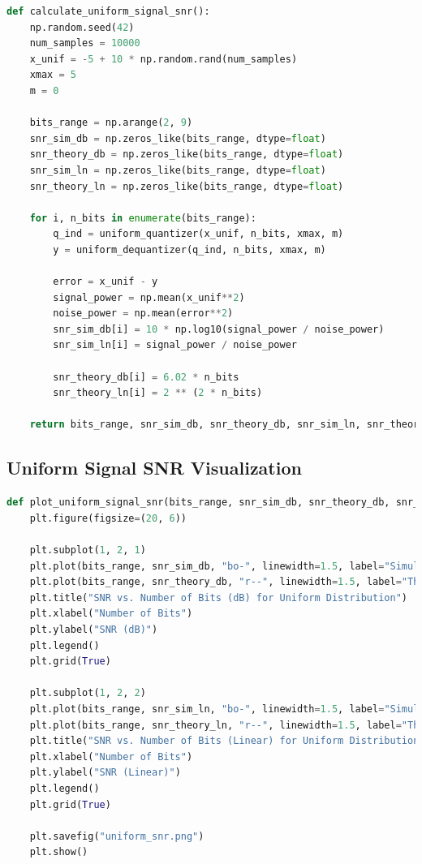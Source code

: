 \documentclass{article}
\begin{document}
\begin{lstlisting}[language=Python, caption=SNR Calculation for Uniform Signal]
def calculate_uniform_signal_snr():
    np.random.seed(42)
    num_samples = 10000
    x_unif = -5 + 10 * np.random.rand(num_samples)
    xmax = 5
    m = 0
    
    bits_range = np.arange(2, 9)
    snr_sim_db = np.zeros_like(bits_range, dtype=float)
    snr_theory_db = np.zeros_like(bits_range, dtype=float)
    snr_sim_ln = np.zeros_like(bits_range, dtype=float)
    snr_theory_ln = np.zeros_like(bits_range, dtype=float)

    for i, n_bits in enumerate(bits_range):
        q_ind = uniform_quantizer(x_unif, n_bits, xmax, m)
        y = uniform_dequantizer(q_ind, n_bits, xmax, m)

        error = x_unif - y
        signal_power = np.mean(x_unif**2)
        noise_power = np.mean(error**2)
        snr_sim_db[i] = 10 * np.log10(signal_power / noise_power)
        snr_sim_ln[i] = signal_power / noise_power

        snr_theory_db[i] = 6.02 * n_bits
        snr_theory_ln[i] = 2 ** (2 * n_bits)
        
    return bits_range, snr_sim_db, snr_theory_db, snr_sim_ln, snr_theory_ln
\end{lstlisting}

\subsection{Uniform Signal SNR Visualization}

\begin{lstlisting}[language=Python, caption=Uniform Signal SNR Visualization]
def plot_uniform_signal_snr(bits_range, snr_sim_db, snr_theory_db, snr_sim_ln, snr_theory_ln):
    plt.figure(figsize=(20, 6))

    plt.subplot(1, 2, 1)
    plt.plot(bits_range, snr_sim_db, "bo-", linewidth=1.5, label="Simulated SNR (dB)")
    plt.plot(bits_range, snr_theory_db, "r--", linewidth=1.5, label="Theoretical SNR (dB)")
    plt.title("SNR vs. Number of Bits (dB) for Uniform Distribution")
    plt.xlabel("Number of Bits")
    plt.ylabel("SNR (dB)")
    plt.legend()
    plt.grid(True)

    plt.subplot(1, 2, 2)
    plt.plot(bits_range, snr_sim_ln, "bo-", linewidth=1.5, label="Simulated SNR (Linear)")
    plt.plot(bits_range, snr_theory_ln, "r--", linewidth=1.5, label="Theoretical SNR (Linear)")
    plt.title("SNR vs. Number of Bits (Linear) for Uniform Distribution")
    plt.xlabel("Number of Bits")
    plt.ylabel("SNR (Linear)")
    plt.legend()
    plt.grid(True)

    plt.savefig("uniform_snr.png")
    plt.show()
\end{lstlisting}
\end{document}
